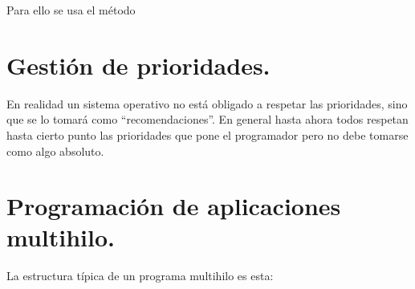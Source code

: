 \documentclass[a4paper,12pt,spanish]{sphinxmanual}
\begin{document}
Para ello se usa el método 


\section{Gestión de prioridades.}
\label{textos/tema2:gestion-de-prioridades}
En realidad un sistema operativo no está obligado a respetar las prioridades, sino que se lo tomará como ``recomendaciones''. En general hasta ahora todos respetan hasta cierto punto las prioridades que pone el programador pero no debe tomarse como algo absoluto.


\section{Programación de aplicaciones multihilo.}
\label{textos/tema2:programacion-de-aplicaciones-multihilo}
La estructura típica de un programa multihilo es esta:
\end{document}

